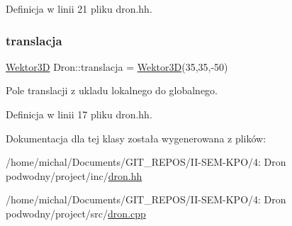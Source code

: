 Definicja w linii 21 pliku dron.\+hh.

\mbox{\label{class_dron_a1b37296f6c286bde4e20c35d77bd03f6}} 
\subsubsection{\texorpdfstring{translacja}{translacja}}
{\footnotesize\ttfamily \hyperlink{class_wektor3_d}{Wektor3D} Dron\+::translacja = \hyperlink{class_wektor3_d}{Wektor3D}(35,35,-\/50)\hspace{0.3cm}{\ttfamily [private]}}



Pole translacji z ukladu lokalnego do globalnego. 



Definicja w linii 17 pliku dron.\+hh.



Dokumentacja dla tej klasy została wygenerowana z plików\+:\begin{DoxyCompactItemize}
\item 
/home/michal/\+Documents/\+G\+I\+T\+\_\+\+R\+E\+P\+O\+S/\+I\+I-\/\+S\+E\+M-\/\+K\+P\+O/4\+: Dron podwodny/project/inc/\hyperlink{dron_8hh}{dron.\+hh}\item 
/home/michal/\+Documents/\+G\+I\+T\+\_\+\+R\+E\+P\+O\+S/\+I\+I-\/\+S\+E\+M-\/\+K\+P\+O/4\+: Dron podwodny/project/src/\hyperlink{dron_8cpp}{dron.\+cpp}\end{DoxyCompactItemize}
